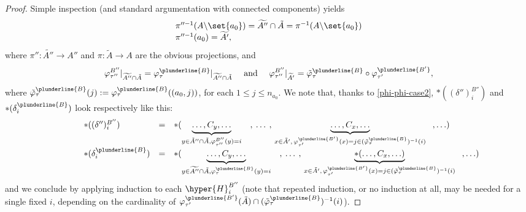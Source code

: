 \begin{proof}
Simple inspection (and standard argumentation with connected components) yields
$$\begin{array}{l}
\pi''^{-1}(A\backslash\set{a_0})= \widetilde{A''}\cap \tilde{A} = \pi^{-1}(A\backslash\set{a_0})\\
\pi''^{-1}(a_0) = \widetilde{A'},
\end{array}$$
where $\pi'':\widetilde{A''}\rightarrow A''$  and $\pi:\tilde{A}\rightarrow A$  are the obvious projections,
and  
\begin{equation} \label{phi-phi-case2}
\varphi^{B''}_{\tau''}|_{\widetilde{A''}\cap \tilde{A}}=\varphi_{\tau}^{\plunderline{B}}|_{\widetilde{A''}\cap \tilde{A}} \quad\mbox{ and }\quad  \varphi^{B''}_{\tau''}|_{\widetilde{A'}}=\tilde{\varphi}^{\plunderline{B}}_{\tau}\circ\varphi^{\plunderline{B'}}_{\tau'},\end{equation} 
where  
$\tilde{\varphi}_{\tau}^{\plunderline{B}}(j):={\varphi}_{\tau}^{\plunderline{B}}((a_0,j))$, for each $1\leq j\leq n_{a_{0}}$.
We  note that, thanks  to \eqref{phi-phi-case2}, $\ast((\delta'')^{B''}_{i})$ and $\ast(\delta_i^{\plunderline{B}})$ look respectively like this:
 $$\begin{array}{lll}
\quad \quad\quad \ast((\delta'')^{B''}_{i}) & = &  \ast(\underbrace{\ldots, C_y, \ldots}_{y\in \tilde{A}''\cap \tilde{A},\varphi_{\tau''}^{B''}(y)=i}\,\,\,\,\,\,,\:\ldots\:,\,\underbrace{\ldots ,C_x, \ldots}_{x\in \tilde{A}',\, \varphi^{\plunderline{B'}}_{\tau'}(x)=j\in (\tilde{\varphi}_{\tau}^{\plunderline{B}})^{-1}(i)}  \,\,\,\;,\ldots)\\
\quad\quad\quad\ast(\delta_i^{\plunderline{B}}) &=& \ast(\underbrace{\ldots, C_{y},\ldots}_{y\in \widetilde{A''}\cap \tilde{A},\varphi_{\tau}^{\plunderline{B}}(y)=i}\,\,\,\,\,\,,\:\ldots\:,\,\underbrace{\ast(\ldots, C_x, \ldots)}_{x\in \tilde{A}',\, \varphi^{\plunderline{B'}}_{\tau'}(x)=j\in (\tilde{\varphi}_{\tau}^{\plunderline{B}})^{-1}(i)}  \,\,\,\;,\ldots)
 \end{array}$$  
 and we conclude by applying   induction  to each $\hyper{H}^{B''}_i$ (note that repeated induction, or no induction at all, may be needed for a single fixed $i$, depending on the cardinality of 
 $\varphi^{\plunderline{B'}}_{\tau'}(\tilde{A})
 \cap (\tilde{\varphi}_{\tau}^{\plunderline{B}})^{-1}(i)$).


\end{proof}
